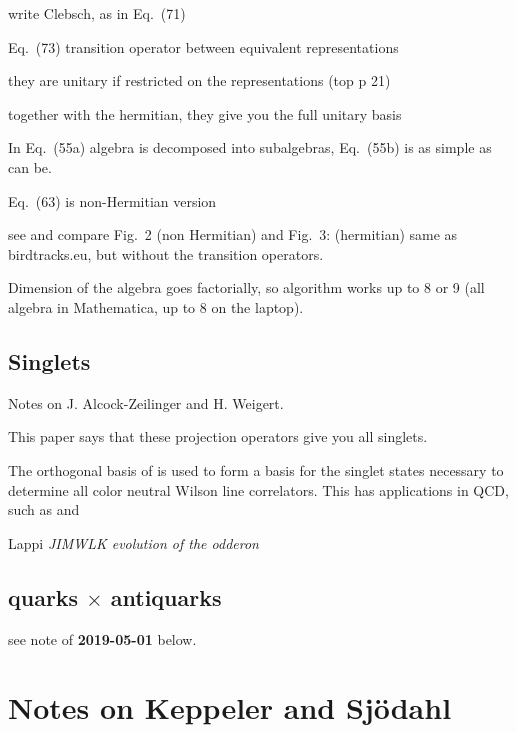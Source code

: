 write Clebsch, as in Eq.~(71)

Eq.~(73) transition operator between equivalent representations

they are unitary if restricted on the representations (top p 21)

together with the hermitian, they give you the full unitary basis

In Eq.~(55a) algebra is decomposed into subalgebras,
Eq.~(55b) is as simple as can be.

Eq.~(63) is non-Hermitian version

see and compare Fig.~2 (non Hermitian) and Fig.~3: (hermitian)
same as birdtracks.eu, but without the transition operators.

Dimension of the algebra goes factorially, so algorithm works up to 8 or 9
(all algebra in Mathematica, up to 8 on the laptop).

\subsection{Singlets}
\label{s-AlcZei16-4}


Notes on J. Alcock-Zeilinger and H. Weigert.

This paper says that these projection operators give you all singlets.

The orthogonal basis of  is used to form a basis for the
singlet states necessary to determine all color neutral Wilson line
correlators. This has applications in  QCD, such as 
and

Lappi \etal{}
{\em {JIMWLK} evolution of the odderon}

\subsection{quarks$~\times~$antiquarks}
\label{s-AlcZei16-qantiq}
see note of {\bf 2019-05-01} below.

\section{Notes on Keppeler and Sj{\"o}dahl}
\label{s-KeppSjo14}

